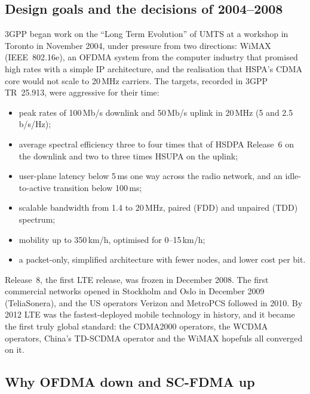 \subsection{Design goals and the decisions of 2004--2008}

3GPP began work on the ``Long Term Evolution'' of UMTS at a workshop in Toronto in November 2004,
under pressure from two directions: WiMAX (IEEE~802.16e), an OFDMA system from the computer industry
that promised high rates with a simple IP architecture, and the realisation that HSPA's CDMA core
would not scale to 20\,MHz carriers. The targets, recorded in 3GPP TR~25.913, were aggressive for
their time:
\begin{itemize}
\item peak rates of 100\,Mb/s downlink and 50\,Mb/s uplink in 20\,MHz (5 and 2.5\,b/s/Hz);
\item average spectral efficiency three to four times that of HSDPA Release~6 on the downlink and two
to three times HSUPA on the uplink;
\item user-plane latency below 5\,ms one way across the radio network, and an idle-to-active
transition below 100\,ms;
\item scalable bandwidth from 1.4 to 20\,MHz, paired (FDD) and unpaired (TDD) spectrum;
\item mobility up to 350\,km/h, optimised for 0--15\,km/h;
\item a packet-only, simplified architecture with fewer nodes, and lower cost per bit.
\end{itemize}
Release~8, the first LTE release, was frozen in December 2008. The first commercial networks opened
in Stockholm and Oslo in December 2009 (TeliaSonera), and the US operators Verizon and MetroPCS
followed in 2010. By 2012 LTE was the fastest-deployed mobile technology in history, and it became
the first truly global standard: the CDMA2000 operators, the WCDMA operators, China's TD-SCDMA
operator and the WiMAX hopefuls all converged on it.

\subsection{Why OFDMA down and SC-FDMA up}


